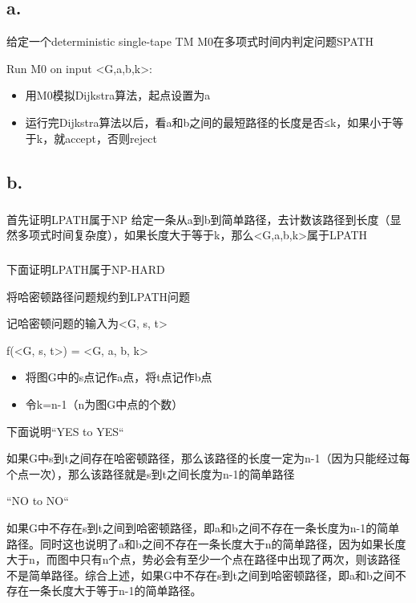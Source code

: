 \documentclass{zpt}
\begin{document}
\subsection{a.}

给定一个deterministic single-tape TM M0在多项式时间内判定问题SPATH

Run M0 on input <G,a,b,k>:

\begin{itemize}
    \item 用M0模拟Dijkstra算法，起点设置为a
    \item 运行完Dijkstra算法以后，看a和b之间的最短路径的长度是否≤k，如果小于等于k，就accept，否则reject
\end{itemize}

\subsection{b.}

\subsubsection{}
首先证明LPATH属于NP
给定一条从a到b到简单路径，去计数该路径到长度（显然多项式时间复杂度），如果长度大于等于k，那么<G,a,b,k>属于LPATH

\subsubsection{}
下面证明LPATH属于NP-HARD

将哈密顿路径问题规约到LPATH问题

记哈密顿问题的输入为<G, s, t>

f(<G, s, t>) = <G, a, b, k>

\begin{itemize}
    \item 将图G中的s点记作a点，将t点记作b点
    \item 令k=n-1（n为图G中点的个数）
\end{itemize}
下面说明“YES to YES“

如果G中s到t之间存在哈密顿路径，那么该路径的长度一定为n-1（因为只能经过每个点一次），那么该路径就是s到t之间长度为n-1的简单路径

“NO to NO“

如果G中不存在s到t之间到哈密顿路径，即a和b之间不存在一条长度为n-1的简单路径。同时这也说明了a和b之间不存在一条长度大于n的简单路径，因为如果长度大于n，而图中只有n个点，势必会有至少一个点在路径中出现了两次，则该路径不是简单路径。综合上述，如果G中不存在s到t之间到哈密顿路径，即a和b之间不存在一条长度大于等于n-1的简单路径。
\end{document}
